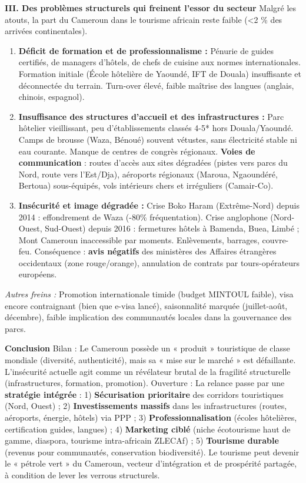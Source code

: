 \documentclass[11pt]{article}
\begin{document}
\begin{corrige}
\textbf{III. Des problèmes structurels qui freinent l'essor du secteur}
Malgré les atouts, la part du Cameroun dans le tourisme africain reste faible (\textless 2 \% des arrivées continentales).
\begin{enumerate}
\item \textbf{Déficit de formation et de professionnalisme :} Pénurie de guides certifiés, de managers d'hôtels, de chefs de cuisine aux normes internationales. Formation initiale (École hôtelière de Yaoundé, IFT de Douala) insuffisante et déconnectée du terrain. Turn-over élevé, faible maîtrise des langues (anglais, chinois, espagnol).
\item \textbf{Insuffisance des structures d'accueil et des infrastructures :} Parc hôtelier vieillissant, peu d'établissements classés 4-5* hors Douala/Yaoundé. Camps de brousse (Waza, Bénoué) souvent vétustes, sans électricité stable ni eau courante. Manque de centres de congrès régionaux. \textbf{Voies de communication} : routes d'accès aux sites dégradées (pistes vers parcs du Nord, route vers l'Est/Dja), aéroports régionaux (Maroua, Ngaoundéré, Bertoua) sous-équipés, vols intérieurs chers et irréguliers (Camair-Co).
\item \textbf{Insécurité et image dégradée :} Crise Boko Haram (Extrême-Nord) depuis 2014 : effondrement de Waza (-80\% fréquentation). Crise anglophone (Nord-Ouest, Sud-Ouest) depuis 2016 : fermetures hôtels à Bamenda, Buea, Limbé ; Mont Cameroun inaccessible par moments. Enlèvements, barrages, couvre-feu. Conséquence : \textbf{avis négatifs} des ministères des Affaires étrangères occidentaux (zone rouge/orange), annulation de contrats par tours-opérateurs européens.
\end{enumerate}
\textit{Autres freins :} Promotion internationale timide (budget MINTOUL faible), visa encore contraignant (bien que e-visa lancé), saisonnalité marquée (juillet-août, décembre), faible implication des communautés locales dans la gouvernance des parcs.

\textbf{Conclusion}
Bilan : Le Cameroun possède un « produit » touristique de classe mondiale (diversité, authenticité), mais sa « mise sur le marché » est défaillante. L'insécurité actuelle agit comme un révélateur brutal de la fragilité structurelle (infrastructures, formation, promotion).
Ouverture : La relance passe par une \textbf{stratégie intégrée} : 1) \textbf{Sécurisation prioritaire} des corridors touristiques (Nord, Ouest) ; 2) \textbf{Investissements massifs} dans les infrastructures (routes, aéroports, énergie, hôtels) via PPP ; 3) \textbf{Professionnalisation} (écoles hôtelières, certification guides, langues) ; 4) \textbf{Marketing ciblé} (niche écotourisme haut de gamme, diaspora, tourisme intra-africain ZLECAf) ; 5) \textbf{Tourisme durable} (revenus pour communautés, conservation biodiversité). Le tourisme peut devenir le « pétrole vert » du Cameroun, vecteur d'intégration et de prospérité partagée, à condition de lever les verrous structurels.
\end{corrige}
\end{document}

